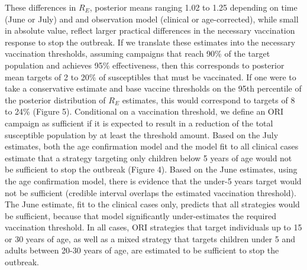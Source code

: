 These differences in $R_E$, posterior means ranging
1.02 to 1.25 depending on time (June or July) and and observation model
(clinical or age-corrected), while small in absolute value, reflect
larger practical differences in the necessary vaccination response to
stop the outbreak. If we translate these estimates into the necessary
vaccination thresholds, assuming campaigns that reach 90\% of the target
population and achieves 95\% effectiveness, then this corresponds to
posterior mean targets of 2 to 20\% of susceptibles that must be
vaccinated. If one were to take a conservative estimate and base vaccine
thresholds on the 95th percentile of the posterior distribution of
$R_E$ estimates, this would correspond to targets of
8 to 24\% (Figure 5). Conditional on a vaccination threshold, we define an
ORI campaign as sufficient if it is expected to result in a reduction of
the total susceptible population by at least the threshold amount. Based
on the July estimates, both the age confirmation model and the model fit
to all clinical cases estimate that a strategy targeting only children
below 5 years of age would not be sufficient to stop the outbreak
(Figure 4). Based on the June estimates, using the age confirmation
model, there is evidence that the under-5 years target would not be
sufficient (credible interval overlaps the estimated vaccination
threshold). The June estimate, fit to the clinical cases only, predicts
that all strategies would be sufficient, because that model
significantly under-estimates the required vaccination threshold. In all
cases, ORI strategies that target individuals up to 15 or 30 years of
age, as well as a mixed strategy that targets children under 5 and
adults between 20-30 years of age, are estimated to be sufficient to
stop the outbreak.